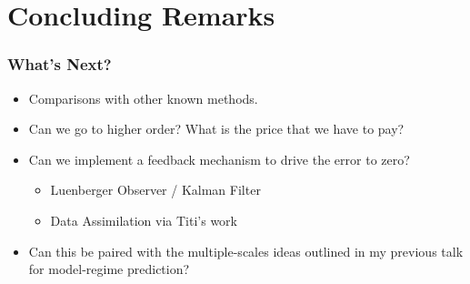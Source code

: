 \section{Concluding Remarks}
\begin{frame}[t]\frametitle{What's Next?}
    \begin{itemize}
        \item[] Comparisons with other known methods.
        \vfill

        \item[] Can we go to higher order?  What is the price that we have to pay?
        \vfill

        \item[] Can we implement a feedback mechanism to drive the error to zero? 
        \begin{itemize}
            \item[] Luenberger Observer / Kalman Filter
            \item[] Data Assimilation via Titi's work
        \end{itemize}
        \vfill

        \item[] Can this be paired with the multiple-scales ideas outlined in my previous talk for model-regime prediction?
        \vfill
    \end{itemize}
\end{frame}
